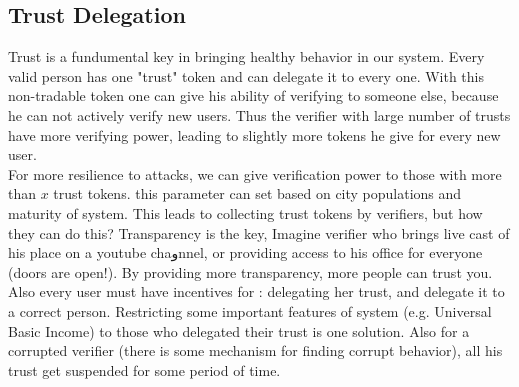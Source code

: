 \documentclass{article}
\begin{document}
\subsection{Trust Delegation}
Trust is a fundumental key in bringing healthy behavior in our system. Every valid person has one "trust" token and can delegate it to every one. With this non-tradable token one can give his ability of verifying to someone else, because he can not actively verify new users. Thus the verifier with large number of trusts have more verifying power, leading to slightly more tokens he give for every new user.
\\
For more resilience to attacks, we can give verification power to those with more than $x$ trust tokens. this parameter can set based on city populations and maturity of system. This leads to collecting trust tokens by verifiers, but how they can do this? Transparency is the key, Imagine verifier who brings live cast of his place on a youtube chaوnnel, or providing access to his office for everyone (doors are open!). By providing more transparency, more people can trust you.
\\
Also every user must have incentives for : delegating her trust, and delegate it to a correct person. Restricting some important features of system (e.g. Universal Basic Income) to those who delegated their trust is one solution. Also for a corrupted verifier (there is some mechanism for finding corrupt behavior), all his trust get suspended for some period of time.
\end{document}
